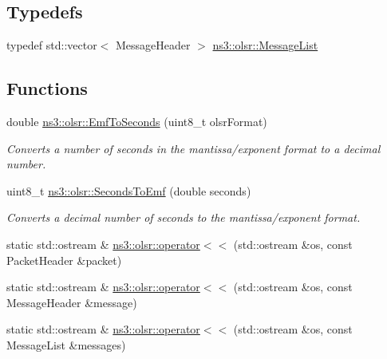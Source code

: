 \subsection*{Typedefs}
\begin{DoxyCompactItemize}
\item 
typedef std\+::vector$<$ Message\+Header $>$ \hyperlink{namespacens3_1_1olsr_af17c710718a5637d01f37804a0a53e78}{ns3\+::olsr\+::\+Message\+List}
\end{DoxyCompactItemize}
\subsection*{Functions}
\begin{DoxyCompactItemize}
\item 
double \hyperlink{namespacens3_1_1olsr_a6d7d7cac3867eec9f70686ab69f1ded6}{ns3\+::olsr\+::\+Emf\+To\+Seconds} (uint8\+\_\+t olsr\+Format)
\begin{DoxyCompactList}\small\item\em Converts a number of seconds in the mantissa/exponent format to a decimal number. \end{DoxyCompactList}\item 
uint8\+\_\+t \hyperlink{namespacens3_1_1olsr_aa544b806b38a4a63280ce21a9b706628}{ns3\+::olsr\+::\+Seconds\+To\+Emf} (double seconds)
\begin{DoxyCompactList}\small\item\em Converts a decimal number of seconds to the mantissa/exponent format. \end{DoxyCompactList}\item 
static std\+::ostream \& \hyperlink{namespacens3_1_1olsr_afa34aff519277684925d5b636843b396}{ns3\+::olsr\+::operator$<$$<$} (std\+::ostream \&os, const Packet\+Header \&packet)
\item 
static std\+::ostream \& \hyperlink{namespacens3_1_1olsr_ac6b1343516e83c29a4139d7d8fb65eea}{ns3\+::olsr\+::operator$<$$<$} (std\+::ostream \&os, const Message\+Header \&message)
\item 
static std\+::ostream \& \hyperlink{namespacens3_1_1olsr_a952f55340bd0ab5ae0cd5f462cf91fe4}{ns3\+::olsr\+::operator$<$$<$} (std\+::ostream \&os, const Message\+List \&messages)
\end{DoxyCompactItemize}
